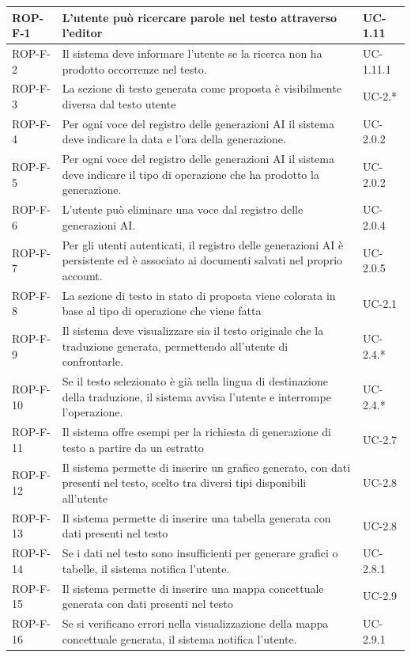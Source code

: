\documentclass[11pt,a4paper]{article}
\begin{document}
\begin{longtable}{|p{}|>{\raggedright\arraybackslash}p{}|p{}|}
ROP-F-1 & L'utente può ricercare parole nel testo attraverso l'editor & UC-1.11 \\
\hline
ROP-F-2 & Il sistema deve informare l'utente se la ricerca non ha prodotto occorrenze nel testo. & UC-1.11.1 \\
\hline
ROP-F-3 & La sezione di testo generata come proposta è visibilmente diversa dal testo utente & UC-2.* \\
\hline
ROP-F-4 & Per ogni voce del registro delle generazioni AI il sistema deve indicare la data e l'ora della generazione. & UC-2.0.2 \\
\hline
ROP-F-5 & Per ogni voce del registro delle generazioni AI il sistema deve indicare il tipo di operazione che ha prodotto la generazione. & UC-2.0.2 \\
\hline
ROP-F-6 & L'utente può eliminare una voce dal registro delle generazioni AI. & UC-2.0.4 \\
\hline
ROP-F-7 & Per gli utenti autenticati, il registro delle generazioni AI è persistente ed è associato ai documenti salvati nel proprio account. & UC-2.0.5 \\
\hline
ROP-F-8 & La sezione di testo in stato di proposta viene colorata in base al tipo di operazione che viene fatta & UC-2.1 \\
\hline
ROP-F-9 & Il sistema deve visualizzare sia il testo originale che la traduzione generata, permettendo all'utente di confrontarle. & UC-2.4.* \\
\hline
ROP-F-10 & Se il testo selezionato è già nella lingua di destinazione della traduzione, il sistema avvisa l'utente e interrompe l'operazione. & UC-2.4.* \\
\hline
ROP-F-11 & Il sistema offre esempi per la richiesta di generazione di testo a partire da un estratto & UC-2.7 \\
\hline
ROP-F-12 & Il sistema permette di inserire un grafico generato, con dati presenti nel testo, scelto tra diversi tipi disponibili all'utente & UC-2.8 \\
\hline
ROP-F-13 & Il sistema permette di inserire una tabella generata con dati presenti nel testo & UC-2.8 \\
\hline
ROP-F-14 & Se i dati nel testo sono insufficienti per generare grafici o tabelle, il sistema notifica l'utente. & UC-2.8.1 \\
\hline
ROP-F-15 & Il sistema permette di inserire una mappa concettuale generata con dati presenti nel testo & UC-2.9 \\
\hline
ROP-F-16 & Se si verificano errori nella visualizzazione della mappa concettuale generata, il sistema notifica l'utente. & UC-2.9.1 \\

\end{longtable}
\end{document}
